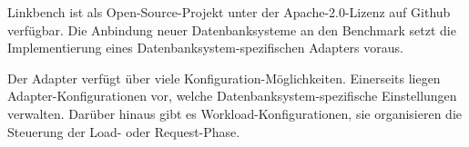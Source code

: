 Linkbench ist als Open-Source-Projekt unter der Apache-2.0-Lizenz auf Github verfügbar. Die Anbindung neuer Datenbanksysteme an den Benchmark setzt die Implementierung eines Datenbanksystem-spezifischen Adapters voraus. 

Der Adapter verfügt über viele Konfiguration-Möglichkeiten. Einerseits liegen Adapter-Konfigurationen vor, welche Datenbanksystem-spezifische Einstellungen verwalten. Darüber hinaus gibt es Workload-Konfigurationen, sie organisieren  die Steuerung der Load- oder Request-Phase. 

